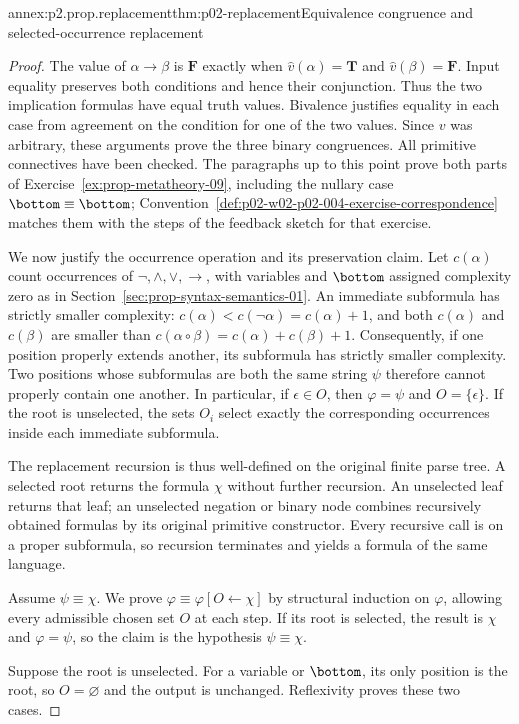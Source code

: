 \begin{annexitem}{annex:p2.prop.replacement}{thm:p02-replacement}{Equivalence congruence and selected-occurrence replacement}
\begin{proof}
The value of \(\alpha\to\beta\) is \(\mathbf F\) exactly when
\(\widehat v(\alpha)=\mathbf T\) and \(\widehat v(\beta)=\mathbf F\).
Input equality preserves both conditions and hence their conjunction.
Thus the two implication formulas have equal truth values.
Bivalence justifies equality in each case from agreement on the condition
for one of the two values.  Since \(v\) was arbitrary, these arguments prove
the three binary congruences.  All primitive connectives have been checked.
The paragraphs up to this point prove both parts of
Exercise~\ref{ex:prop-metatheory-09}, including the nullary case
\(\bottom\equiv\bottom\);
Convention~\ref{def:p02-w02-p02-004-exercise-correspondence} matches them
with the steps of the feedback sketch for that exercise.

We now justify the occurrence operation and its preservation claim.
Let \(c(\alpha)\) count occurrences of \(\neg,\land,\lor,\to\), with
variables and \(\bottom\) assigned complexity zero as in
Section~\ref{sec:prop-syntax-semantics-01}.
An immediate subformula has strictly smaller complexity:
\(c(\alpha)<c(\neg\alpha)=c(\alpha)+1\), and both
\(c(\alpha)\) and \(c(\beta)\) are smaller than
\(c(\alpha\circ\beta)=c(\alpha)+c(\beta)+1\).
Consequently, if one position properly extends another, its subformula has
strictly smaller complexity.  Two positions whose subformulas are both the
same string \(\psi\) therefore cannot properly contain one another.
In particular, if \(\epsilon\in O\), then \(\varphi=\psi\) and
\(O=\{\epsilon\}\).  If the root is unselected, the sets \(O_i\) select exactly
the corresponding occurrences inside each immediate subformula.

The replacement recursion is thus well-defined on the original finite parse
tree.  A selected root returns the formula \(\chi\) without further
recursion.  An unselected leaf returns that leaf; an unselected negation or
binary node combines recursively obtained formulas by its original primitive
constructor.  Every recursive call is on a proper subformula, so recursion
terminates and yields a formula of the same language.

Assume \(\psi\equiv\chi\).  We prove
\(\varphi\equiv\varphi[O\leftarrow\chi]\) by structural induction on
\(\varphi\), allowing every admissible chosen set \(O\) at each step.
If its root is selected, the result is \(\chi\) and
\(\varphi=\psi\), so the claim is the hypothesis \(\psi\equiv\chi\).

Suppose the root is unselected.  For a variable or \(\bottom\), its only
position is the root, so \(O=\varnothing\) and the output is unchanged.
Reflexivity proves these two cases.


\end{proof}
\end{annexitem}
